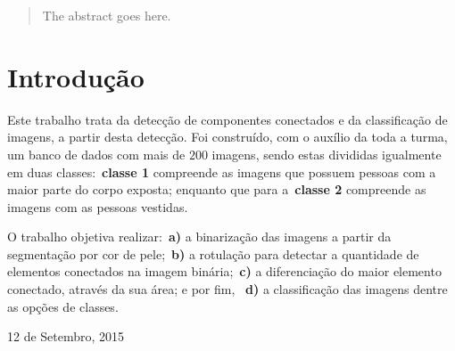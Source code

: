 \documentclass[conference]{Trabalho_1}
\begin{document}
\begin{abstract}
The abstract goes here.
\end{abstract}





%
\IEEEpeerreviewmaketitle



\section{Introdu\c{c}\~ao}
Este trabalho trata da detec\c{c}\~ao de componentes conectados e da classifica\c{c}\~ao de imagens, a partir desta detec\c{c}\~ao. Foi constru\'ido, com o aux\'ilio da toda a turma, um banco de dados com mais de $200$ imagens, sendo estas divididas igualmente em duas classes:~\textbf{classe 1} compreende as imagens que possuem pessoas com a maior parte do corpo exposta; enquanto que para a~\textbf{classe 2} compreende as imagens com as pessoas vestidas.

O trabalho objetiva realizar:~\textbf{a)} a binariza\c{c}\~ao das imagens a partir da segmenta\c{c}\~ao por cor de pele;~\textbf{b)} a rotula\c{c}\~ao para detectar a quantidade de elementos conectados na imagem bin\'aria;~\textbf{c)} a diferencia\c{c}\~ao do maior elemento conectado, atrav\'es da sua \'area; e por fim, ~\textbf{d)} a classifica\c{c}\~ao das imagens dentre as op\c{c}\~oes de classes.

 
\hfill 12 de Setembro, 2015


%
%
\end{document}
